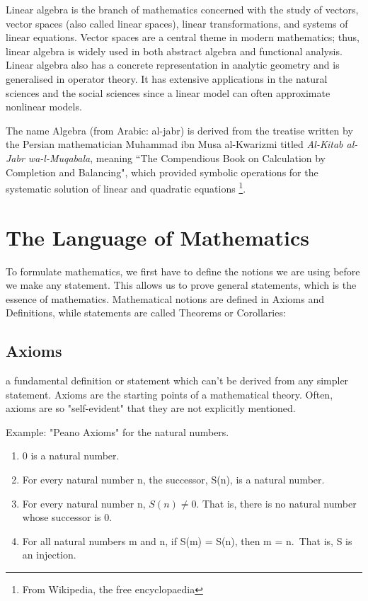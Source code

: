 \documentclass[
  a4paper,
  DIV=11,
  numbers=noendperiod,
  oneside]{scrreprt}
\theoremstyle{definition}
\theoremstyle{remark}
\begin{document}
Linear algebra is the branch of mathematics concerned with the study of
vectors, vector spaces (also called linear spaces), linear
transformations, and systems of linear equations. Vector spaces are a
central theme in modern mathematics; thus, linear algebra is widely used
in both abstract algebra and functional analysis. Linear algebra also
has a concrete representation in analytic geometry and is generalised in
operator theory. It has extensive applications in the natural sciences
and the social sciences since a linear model can often approximate
nonlinear models.

The name Algebra (from Arabic: al-jabr) is derived from the treatise
written by the Persian mathematician Muhammad ibn Musa al-Kwarizmi
titled \emph{Al-Kitab al-Jabr wa-l-Muqabala}, meaning ``The Compendious
Book on Calculation by Completion and Balancing", which provided
symbolic operations for the systematic solution of linear and quadratic
equations \footnote{From Wikipedia, the free encyclopaedia}.

\section{The Language of Mathematics}\label{the-language-of-mathematics}

To formulate mathematics, we first have to define the notions we are
using before we make any statement. This allows us to prove general
statements, which is the essence of mathematics. Mathematical notions
are defined in Axioms and Definitions, while statements are called
Theorems or Corollaries:

\subsection{Axioms}\label{axioms}

a fundamental definition or statement which can't be derived from any
simpler statement. Axioms are the starting points of a mathematical
theory. Often, axioms are so "self-evident" that they are not explicitly
mentioned.

Example: "Peano Axioms" for the natural numbers.

\begin{enumerate}
\def\labelenumi{\arabic{enumi}.}
\item
  0 is a natural number.
\item
  For every natural number n, the successor, S(n), is a natural number.
\item
  For every natural number n, \(S(n) \neq 0\). That is, there is no
  natural number whose successor is 0.
\item
  For all natural numbers m and n, if S(m) = S(n), then m = n.~That is,
  S is an injection.
\end{enumerate}
\end{document}
